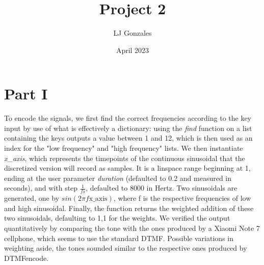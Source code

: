 \documentclass{article}
\title{Project 2}
\author{LJ Gonzales}
\date{April 2023}
\begin{document}
\maketitle
\section{Part I}
To encode the signals, we first find the correct frequencies according to the key input by use of what is effectively a dictionary: using the \emph{find} function on a list containing the keys outputs a value between 1 and 12, which is then used as an index for the "low frequency" and "high frequency" lists. 
We then instantiate \emph{x_axis}, which represents the timepoints of the continuous sinusoidal that the discretized version will record as samples.
It is a linspace range beginning at 1, ending at the user parameter \emph{duration} (defaulted to 0.2 and measured in seconds), and with step $\frac{1}{fs}$, defaulted to 8000 in Hertz.
Two sinusoidals are generated, one by $sin(2\pi f\text{x_axis})$, where f is the respective frequencies of low and high sinusoidal.
Finally, the function returns the weighted addition of these two sinusoidals, defaulting to 1,1 for the weights.
We verified the output quantitatively by comparing the tone with the ones produced by a Xiaomi Note 7 cellphone, which seems to use the standard DTMF. Possible variations in weighting aside, the tones sounded similar to the respective ones produced by DTMFencode.
\end{document}
